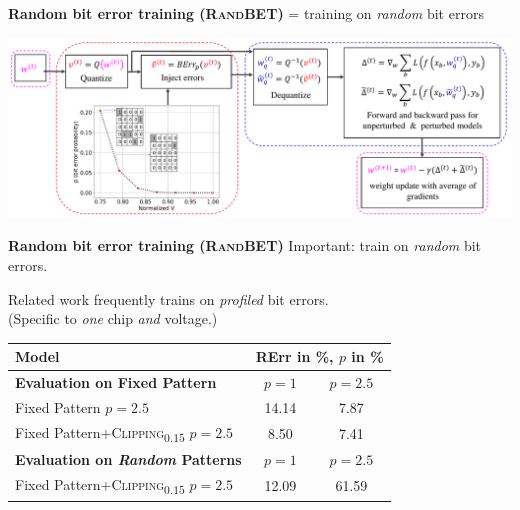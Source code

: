 \documentclass[64pt]{beamer}
\DeclareRobustCommand{\RTE}{%
	\ifmmode
	\text{RErr}
	\else
	RErr\xspace
	\fi
}
\begin{document}
	\begin{frame}[t]{\bfseries Random bit error training (\textsc{RandBET})}
		\Large 
		= training on \emph{random} bit errors
		
		\begin{center}
			\includegraphics[width=\textwidth]{../paper/main_training_flow4}
		\end{center}
	\end{frame}
	
	\begin{frame}[t]{\bfseries Random bit error training (\textsc{RandBET})}
		\Large
		Important: train on \emph{random} bit errors.
		\vspace*{0.25cm}
		
		Related work frequently trains on \emph{profiled} bit errors.\\
		{\large(Specific to \emph{one} chip \emph{and} voltage.)}
		 
		\begin{center}
			\begin{tabular}{| l | c | c |}
				\hline
				Model & \multicolumn{2}{c|}{\RTE in \%, $p$ in \%}\\
				\hline
				\hline
				\textbf{Evaluation on Fixed Pattern} & $p{=}1$ & $p{=}2.5$\\
				\hline
				Fixed Pattern $p{=}2.5$ & {\color{colorbrewer1}14.14} & 7.87\\
				Fixed Pattern+\textsc{Clipping}\textsubscript{$0.15$} $p{=}2.5$ & {\color{colorbrewer1}8.50} & 7.41\\
				\hline\hline
				\textbf{Evaluation on \emph{Random} Patterns} & $p{=}1$ & $p{=}2.5$\\
				\hline
				Fixed Pattern+\textsc{Clipping}\textsubscript{$0.15$} $p{=}2.5$ & 12.09 & 61.59\\
				\hline
			\end{tabular}
		\end{center}
	\end{frame}
	
\end{document}
